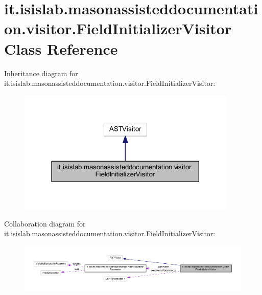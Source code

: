 \hypertarget{classit_1_1isislab_1_1masonassisteddocumentation_1_1visitor_1_1_field_initializer_visitor}{\section{it.\-isislab.\-masonassisteddocumentation.\-visitor.\-Field\-Initializer\-Visitor Class Reference}
\label{classit_1_1isislab_1_1masonassisteddocumentation_1_1visitor_1_1_field_initializer_visitor}
}


Inheritance diagram for it.\-isislab.\-masonassisteddocumentation.\-visitor.\-Field\-Initializer\-Visitor\-:
\nopagebreak
\begin{figure}[H]
\begin{center}
\leavevmode
\includegraphics[width=296pt]{classit_1_1isislab_1_1masonassisteddocumentation_1_1visitor_1_1_field_initializer_visitor__inherit__graph}
\end{center}
\end{figure}


Collaboration diagram for it.\-isislab.\-masonassisteddocumentation.\-visitor.\-Field\-Initializer\-Visitor\-:
\nopagebreak
\begin{figure}[H]
\begin{center}
\leavevmode
\includegraphics[width=350pt]{classit_1_1isislab_1_1masonassisteddocumentation_1_1visitor_1_1_field_initializer_visitor__coll__graph}
\end{center}
\end{figure}
